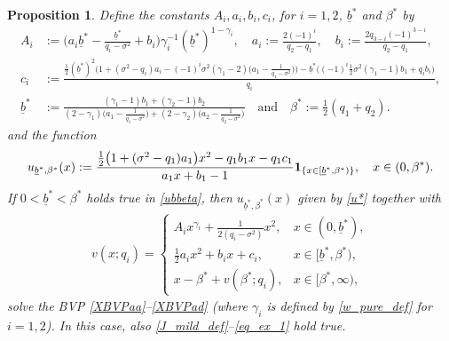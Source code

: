 \documentclass[11pt]{article} %
\newtheorem{proposition}[theorem]{Proposition}
\def\ub{\underline{b}}
\numberwithin{komcounter}{section}
\begin{document}
\begin{proposition} \label{thm:mildvalue} 
Define the constants $A_i,a_i,b_i,c_i$, for $i=1,2$, $\ub^*$ and $\beta^*$ by 
\begin{align}
A_i &:= \Big(a_i \ub^* -\frac{\ub^*}{q_i-\sigma^2} + b_i \Big) \gamma_i^{-1} (\ub^*)^{1-\gamma_i}, \quad a_i := \frac{2 (-1)^i}{q_2-q_1}, \quad 
b_i := \frac{2 q_{3-i} (-1)^{3-i}}{q_2-q_1}, \label{Aiaibi}\\
c_i &:= \frac{\tfrac12 (\ub^*)^2 \big(1 + (\sigma^2 - q_i) a_i -(-1)^i \sigma^2 (\gamma_1 - 2) \big(a_1 -\frac{1}{q_1-\sigma^2}\big) \big) - \ub^* \big((-1)^i \tfrac12 \sigma^2 (\gamma_1 - 1) b_1 + q_i b_i\big)}{q_i}, \label{ci}\\
\ub^* &:=\frac{(\gamma_1-1)b_1+ (\gamma_2-1)b_2}{(2-\gamma_1) \big(a_1-\frac{1}{q_1-\sigma^2}\big) + (2-\gamma_2) \big(a_2-\frac{1}{q_2-\sigma^2}\big)} 
\quad \text{and} \quad 
\beta^* := \tfrac{1}{2} (q_1 + q_2).\label{ubbeta}
\end{align}
and the function
\begin{equation} \label{u*}
u_{\ub^*,\beta^*}(x) 
:= \frac{\tfrac12 \big(1 + (\sigma^2 - q_1) a_1 \big) x^2 - q_1 b_1 x - q_1 c_1}{a_1 x + b_1 - 1} {\bf 1}_{\{x \in [\ub^*,\beta^*)\}}, \quad x \in (0,\beta^*).
\end{equation}
If $0 < \ub^* < \beta^*$ holds true in \eqref{ubbeta}, then $u_{\ub^*,\beta^*}(x)$ given by \eqref{u*} together with
\begin{align}\label{candv}
v(x;q_i)= \begin{cases}
A_i x^{\gamma_i}+\frac{1}{2(q_i-\sigma^2)} x^2, & x\in (0,\ub^*), \\
\frac{1}{2} a_i x^2 + b_i x + c_i, 
& x \in [\ub^*,\beta^*), \\
x - \beta^* + v(\beta^*;q_i), & x \in [\beta^*,\infty),
\end{cases}
\end{align} 
solve the BVP \eqref{XBVPaa}--\eqref{XBVPad} (where $\gamma_i$ is defined by \eqref{w_pure_def} for $i=1,2$). 
In this case, also \eqref{J_mild_def}--\eqref{eq_ex_1} hold true. 
\end{proposition}
\end{document}
